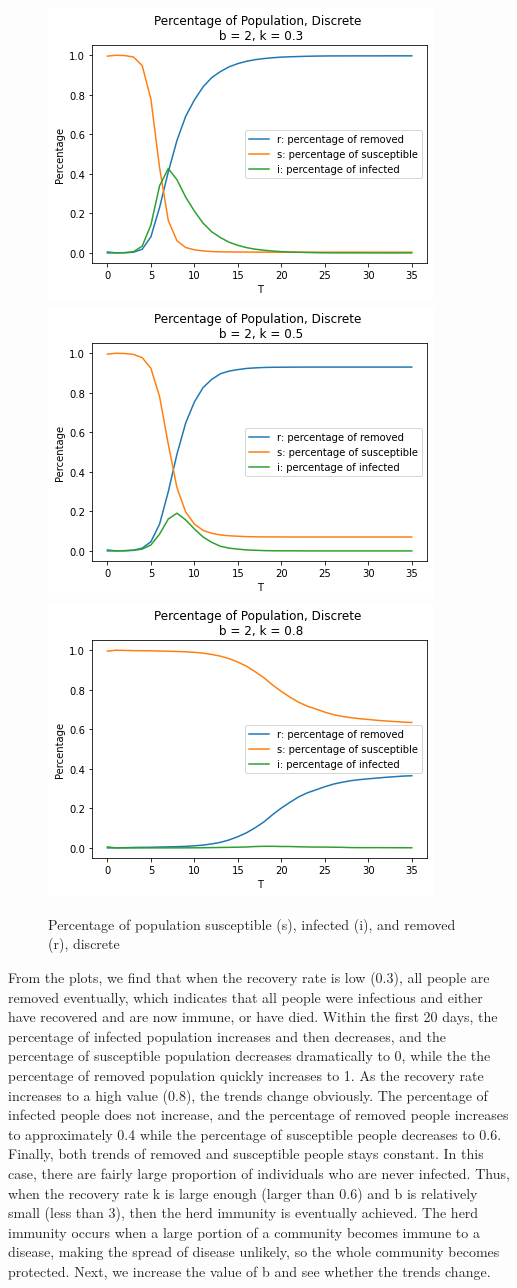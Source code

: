 \documentclass{article}
\begin{document}
\begin{figure}[htp]

\centering
\includegraphics[width=.3\textwidth]{Figure1_discrete_sir_b2_k1.png}\hfill
\includegraphics[width=.3\textwidth]{Figure1_discrete_sir_b2_k2.png}\hfill
\includegraphics[width=.3\textwidth]{Figure1_discrete_sir_b2_k3.png}

\caption{Percentage of population susceptible (s), infected (i), and removed (r), discrete}
\label{fig:figure3}

\end{figure}



From the plots, we find that when the recovery rate is low (0.3), all people are removed eventually, which indicates that all people were infectious and either have recovered and are now immune, or have died. Within the first 20 days, the percentage of infected population increases and then decreases, and the percentage of susceptible population decreases dramatically to 0, while the the percentage of removed population quickly increases to 1. As the recovery rate increases to a high value (0.8), the trends change obviously. The percentage of infected people does not increase, and the percentage of removed people increases to approximately 0.4 while the percentage of susceptible people decreases to 0.6. Finally, both trends of removed and susceptible people stays constant. In this case, there are fairly large proportion of individuals who are never infected. Thus, when the recovery rate k is large enough (larger than 0.6) and b is relatively small (less than 3), then the herd immunity is eventually achieved. The herd immunity occurs when a large portion of a community becomes immune to a disease, making the spread of disease unlikely, so the whole community becomes protected. Next, we increase the value of b and see whether the trends change.
\end{document}
